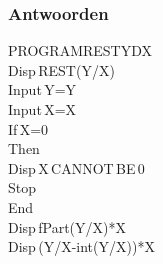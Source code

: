 % 
% 



\begin{frame}
\frametitle{Antwoorden}

\begin{ticalc}[5cm]
	PROGRAM\:RESTYDX\\%
	\:Disp\,\qt REST(Y/X)\:\qt\\%
	\:Input\,\qt Y=\qt\comma Y\\%
	\:Input\,\qt X=\qt\comma X\\%
	\:If\,X=0\\%
	\:Then\\%
	\:Disp\,\qt X\,CANNOT\,BE\,0\qt\\%
	\:Stop\\%
	\:End\\%
	\:Disp\,fPart(Y/X)*X\\%
	\:Disp\,(Y/X-int(Y/X))*X%
\end{ticalc}

\end{frame}





